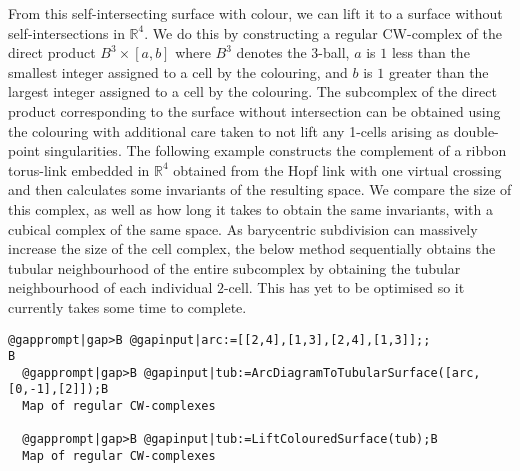 \documentclass[a4paper,11pt]{report}
\begin{document}
{{\begin{Verbatim}[commandchars=@|B,fontsize=\small,frame=single,label=Example]
\end{Verbatim}
 From this self-intersecting surface with colour, we can lift it to a surface
without self-intersections in $\mathbb{R}^4$. We do this by constructing a regular CW-complex of the direct product $B^3 \times [a,b]$ where $B^3$ denotes the $3$-ball, $a$ is $1$ less than the smallest integer assigned to a cell by the colouring, and $b$ is $1$ greater than the largest integer assigned to a cell by the colouring. The
subcomplex of the direct product corresponding to the surface without
intersection can be obtained using the colouring with additional care taken to
not lift any 1-cells arising as double-point singularities. The following
example constructs the complement of a ribbon torus-link embedded in $\mathbb{R}^4$ obtained from the Hopf link with one virtual crossing and then calculates some
invariants of the resulting space. We compare the size of this complex, as
well as how long it takes to obtain the same invariants, with a cubical
complex of the same space. As barycentric subdivision can massively increase
the size of the cell complex, the below method sequentially obtains the
tubular neighbourhood of the entire subcomplex by obtaining the tubular
neighbourhood of each individual $2$-cell. This has yet to be optimised so it currently takes some time to
complete. 
\begin{Verbatim}[commandchars=@|B,fontsize=\small,frame=single,label=Example]
  @gapprompt|gap>B @gapinput|arc:=[[2,4],[1,3],[2,4],[1,3]];;                B
  @gapprompt|gap>B @gapinput|tub:=ArcDiagramToTubularSurface([arc,[0,-1],[2]]);B
  Map of regular CW-complexes
  
  @gapprompt|gap>B @gapinput|tub:=LiftColouredSurface(tub);B
  Map of regular CW-complexes
  

\end{Verbatim}}}
\end{document}
